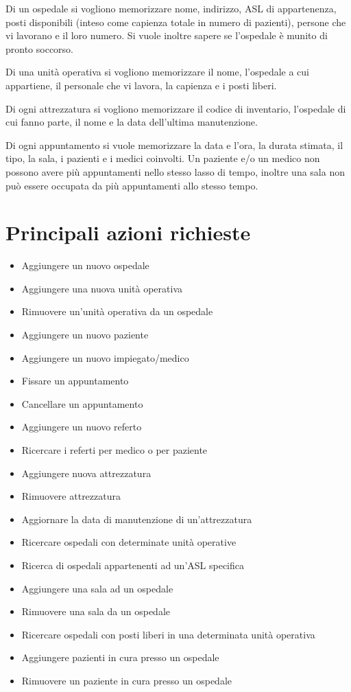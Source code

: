\documentclass[a4paper,12pt]{report}
\begin{document}
Di un ospedale si vogliono memorizzare nome, indirizzo, ASL di appartenenza, posti disponibili (inteso come capienza totale in numero di pazienti),
persone che vi lavorano e il loro numero. Si vuole inoltre sapere se l'ospedale è munito di pronto soccorso.

Di una unità operativa si vogliono memorizzare il nome, l'ospedale a cui appartiene, il personale che vi lavora, la capienza e i posti liberi.

Di ogni attrezzatura si vogliono memorizzare il codice di inventario, l'ospedale di cui fanno parte, il nome e la data dell'ultima manutenzione.

Di ogni appuntamento si vuole memorizzare la data e l'ora, la durata stimata, il tipo, la sala, i pazienti e i medici coinvolti. 
Un paziente e/o un medico non possono avere più appuntamenti nello stesso lasso di tempo, inoltre una sala non può essere occupata da più 
appuntamenti allo stesso tempo.
\section{Principali azioni richieste}
\begin{itemize}
  \item Aggiungere un nuovo ospedale
  \item Aggiungere una nuova unità operativa
  \item Rimuovere un'unità operativa da un ospedale
  \item Aggiungere un nuovo paziente
  \item Aggiungere un nuovo impiegato/medico
  \item Fissare un appuntamento
  \item Cancellare un appuntamento
  \item Aggiungere un nuovo referto
  \item Ricercare i referti per medico o per paziente
  \item Aggiungere nuova attrezzatura
  \item Rimuovere attrezzatura
  \item Aggiornare la data di manutenzione di un'attrezzatura
  \item Ricercare ospedali con determinate unità operative
  \item Ricerca di ospedali appartenenti ad un'ASL specifica
  \item Aggiungere una sala ad un ospedale
  \item Rimuovere una sala da un ospedale
  \item Ricercare ospedali con posti liberi in una determinata unità operativa
  \item Aggiungere pazienti in cura presso un ospedale
  \item Rimuovere un paziente in cura presso un ospedale
\end{itemize}
\end{document}
